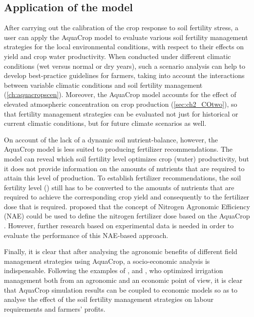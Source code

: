 \subsection{Application of the model}
After carrying out the calibration of the crop response to soil fertility stress, a user can apply the AquaCrop model to evaluate various soil fertility management strategies for the local environmental conditions, with respect to their effects on yield and crop water productivity. When conducted under different climatic conditions (wet versus normal or dry years), such a scenario analysis can help to develop best-practice guidelines for farmers, taking into account the interactions between variable climatic conditions and soil fertility management (\autoref{ch:aquacropscen}). Moreover, the AquaCrop model accounts for the effect of elevated atmospheric \COtwo concentration on crop production (\autoref{sec:ch2_COtwo}), so that fertility management strategies can be evaluated not just for historical or current climatic conditions, but for future climate scenarios as well. 

On account of the lack of a dynamic soil nutrient-balance, however, the AquaCrop model is less suited to producing fertilizer recommendations. The model can reveal which soil fertility level optimizes crop (water) productivity, but it does not provide information on the amounts of nutrients that are required to attain this level of production. To establish fertilizer recommendations, the soil fertility level (\Brel) still has to be converted to the amounts of nutrients that are required to achieve the corresponding crop yield and consequently to the fertilizer dose that is required. \textcite{oyarmoi2013} proposed that the concept of Nitrogen Agronomic Efficiency (NAE) could be used to define the nitrogen fertilizer dose based on the AquaCrop \Brel. However, further research based on experimental data is needed in order to evaluate the performance of this NAE-based approach. 

Finally, it is clear that after analysing the agronomic benefits of different field management strategies using AquaCrop, a socio-economic analysis is indispensable. Following the examples of \textcite{garciavila2009}, \textcite{garciavila2012} and \textcite{cusicanqui2013}, who optimized irrigation management both from an agronomic and an economic point of view, it is clear that AquaCrop simulation results can be coupled to economic models so as to analyse the effect of the soil fertility management strategies on labour requirements and farmers' profits.
\clearpage

